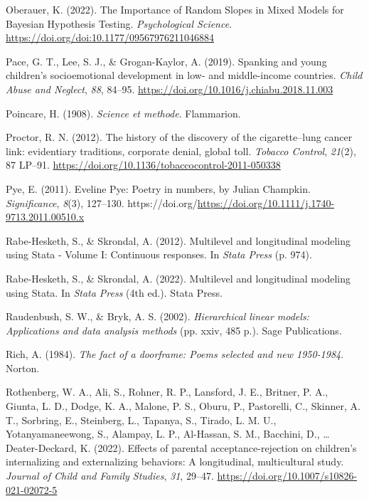 \documentclass[
  letterpaper,
  DIV=11,
  numbers=noendperiod]{scrreprt}
\newlength{\cslhangindent}
\newlength{\cslentryspacingunit} %
\newenvironment{CSLReferences}[2] %
 {%
  \setlength{\parindent}{0pt}
  \ifodd #1
  \let\oldpar\par
  \def\par{\hangindent=\cslhangindent\oldpar}
  \fi
  \setlength{\parskip}{#2\cslentryspacingunit}
 }%
 {}
\begin{document}
\begin{CSLReferences}{1}{0}
\leavevmode{}%
Oberauer, K. (2022). {The Importance of Random Slopes in Mixed Models
for Bayesian Hypothesis Testing}. \emph{Psychological Science}.
\url{https://doi.org/doi:10.1177/09567976211046884}

\leavevmode{}%
Pace, G. T., Lee, S. J., \& Grogan-Kaylor, A. (2019). {Spanking and
young children's socioemotional development in low- and middle-income
countries}. \emph{Child Abuse and Neglect}, \emph{88}, 84--95.
\url{https://doi.org/10.1016/j.chiabu.2018.11.003}

\leavevmode{}%
Poincare, H. (1908). \emph{Science et methode}. Flammarion.

\leavevmode{}%
Proctor, R. N. (2012). {The history of the discovery of the
cigarette--lung cancer link: evidentiary traditions, corporate denial,
global toll}. \emph{Tobacco Control}, \emph{21}(2), 87 LP--91.
\url{https://doi.org/10.1136/tobaccocontrol-2011-050338}

\leavevmode{}%
Pye, E. (2011). {E}veline {P}ye: Poetry in numbers, by {J}ulian
{C}hampkin. \emph{Significance}, \emph{8}(3), 127--130.
https://doi.org/\url{https://doi.org/10.1111/j.1740-9713.2011.00510.x}

\leavevmode{}%
Rabe-Hesketh, S., \& Skrondal, A. (2012). Multilevel and longitudinal
modeling using {S}tata - {V}olume {I}: Continuous responses. In
\emph{Stata Press} (p. 974).

\leavevmode{}%
Rabe-Hesketh, S., \& Skrondal, A. (2022). Multilevel and longitudinal
modeling using {S}tata. In \emph{Stata Press} (4th ed.). Stata Press.

\leavevmode{}%
Raudenbush, S. W., \& Bryk, A. S. (2002). \emph{Hierarchical linear
models: Applications and data analysis methods} (pp. xxiv, 485 p.). Sage
Publications.

\leavevmode{}%
Rich, A. (1984). \emph{The fact of a doorframe: Poems selected and new
1950-1984}. Norton.

\leavevmode{}%
Rothenberg, W. A., Ali, S., Rohner, R. P., Lansford, J. E., Britner, P.
A., Giunta, L. D., Dodge, K. A., Malone, P. S., Oburu, P., Pastorelli,
C., Skinner, A. T., Sorbring, E., Steinberg, L., Tapanya, S., Tirado, L.
M. U., Yotanyamaneewong, S., Alampay, L. P., Al-Hassan, S. M., Bacchini,
D., \ldots{} Deater-Deckard, K. (2022). Effects of parental
acceptance-rejection on children's internalizing and externalizing
behaviors: A longitudinal, multicultural study. \emph{Journal of Child
and Family Studies}, \emph{31}, 29--47.
\url{https://doi.org/10.1007/s10826-021-02072-5}


\end{CSLReferences}
\end{document}
